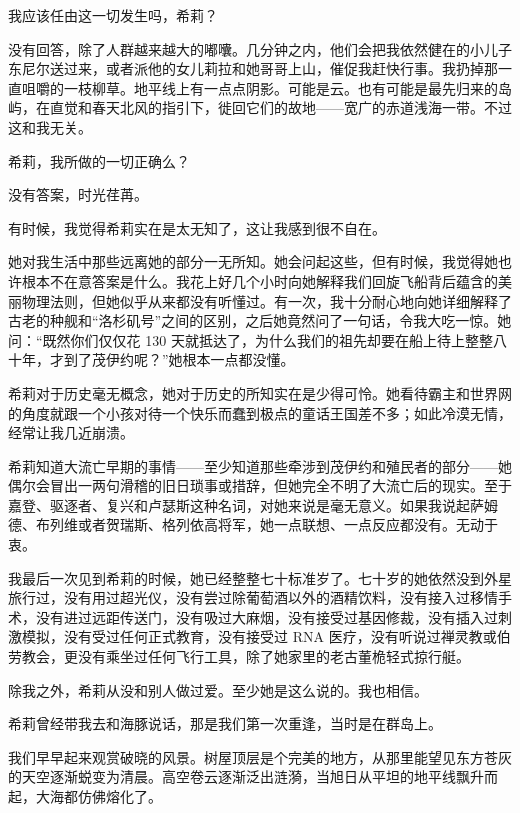 \documentclass[AutoFakeBold=true]{book}
\begin{document}
我应该任由这一切发生吗，希莉？

没有回答，除了人群越来越大的嘟囔。几分钟之内，他们会把我依然健在的小儿子东尼尔送过来，或者派他的女儿莉拉和她哥哥上山，催促我赶快行事。我扔掉那一直咀嚼的一枝柳草。地平线上有一点点阴影。可能是云。也有可能是最先归来的岛屿，在直觉和春天北风的指引下，徙回它们的故地——宽广的赤道浅海一带。不过这和我无关。

{\kaishu 希莉，我所做的一切正确么？}

没有答案，时光荏苒。

\vspace*{1em}

有时候，我觉得希莉实在是太无知了，这让我感到很不自在。

她对我生活中那些远离她的部分一无所知。她会问起这些，但有时候，我觉得她也许根本不在意答案是什么。我花上好几个小时向她解释我们回旋飞船背后蕴含的美丽物理法则，但她似乎从来都没有听懂过。有一次，我十分耐心地向她详细解释了古老的种舰和``洛杉矶号''之间的区别，之后她竟然问了一句话，令我大吃一惊。她问：``既然你们仅仅花 130 天就抵达了，为什么我们的祖先却要在船上待上整整八十年，才到了茂伊约呢？''她根本一点都没懂。

希莉对于历史毫无概念，她对于历史的所知实在是少得可怜。她看待霸主和世界网的角度就跟一个小孩对待一个快乐而蠢到极点的童话王国差不多；如此冷漠无情，经常让我几近崩溃。

希莉知道大流亡早期的事情——至少知道那些牵涉到茂伊约和殖民者的部分——她偶尔会冒出一两句滑稽的旧日琐事或措辞，但她完全不明了大流亡后的现实。至于嘉登、驱逐者、复兴和卢瑟斯这种名词，对她来说是毫无意义。如果我说起萨姆德、布列维或者贺瑞斯、格列依高将军，她一点联想、一点反应都没有。无动于衷。

我最后一次见到希莉的时候，她已经整整七十标准岁了。七十岁的她依然没到外星旅行过，没有用过超光仪，没有尝过除葡萄酒以外的酒精饮料，没有接入过移情手术，没有进过远距传送门，没有吸过大麻烟，没有接受过基因修裁，没有插入过刺激模拟，没有受过任何正式教育，没有接受过 RNA 医疗，没有听说过禅灵教或伯劳教会，更没有乘坐过任何飞行工具，除了她家里的老古董桅轻式掠行艇。

除我之外，希莉从没和别人做过爱。至少她是这么说的。我也相信。

\vspace*{1em}

希莉曾经带我去和海豚说话，那是我们第一次重逢，当时是在群岛上。

我们早早起来观赏破晓的风景。树屋顶层是个完美的地方，从那里能望见东方苍灰的天空逐渐蜕变为清晨。高空卷云逐渐泛出涟漪，当旭日从平坦的地平线飘升而起，大海都仿佛熔化了。
\end{document}
